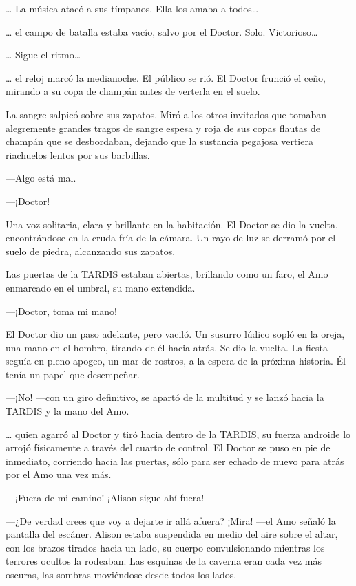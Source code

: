 {\ldots{} La música atacó a sus tímpanos. Ella los amaba a
 todos\ldots{}}

{\ldots{} el campo de batalla estaba vacío, salvo por el Doctor. Solo.
 Victorioso\ldots{}}

{\ldots{} Sigue el ritmo\ldots{}}

{\ldots{} el reloj marcó la medianoche. El público se rió. El Doctor
 frunció el ceño, mirando a su copa de champán antes de verterla en el
suelo.}

{La sangre salpicó sobre sus zapatos. Miró a los
 otros invitados que tomaban alegremente grandes tragos de sangre espesa
 y roja de sus copas flautas de champán que se desbordaban, dejando que
la sustancia pegajosa vertiera riachuelos lentos por sus barbillas.}

{---Algo está mal.}

{---¡Doctor!}

{Una voz solitaria, clara y brillante en la habitación. El Doctor se dio
 la vuelta, encontrándose en la cruda fría de la cámara. Un rayo de luz
se derramó por el suelo de piedra, alcanzando sus zapatos.}

{Las puertas de la TARDIS estaban abiertas, brillando como un faro, el
Amo enmarcado en el umbral, su mano extendida.}

{---¡Doctor, toma mi mano!}

{El Doctor dio un paso adelante, pero vaciló. Un susurro lúdico sopló en
 la oreja, una mano en el hombro, tirando de él hacia atrás. Se dio la
 vuelta. La fiesta seguía en pleno apogeo, un mar de rostros, a la espera
de la próxima historia. Él tenía un papel que desempeñar.}

{---¡No! ---con un giro definitivo, se apartó de la multitud y se lanzó
hacia la TARDIS y la mano del Amo.}

{\ldots{} quien
 agarró al Doctor y tiró hacia dentro de la TARDIS, su fuerza androide lo
 arrojó físicamente a través del cuarto de control. El Doctor se puso en
 pie de inmediato, corriendo hacia las puertas, sólo para ser echado de
nuevo para atrás por el Amo una vez más.}

{---¡Fuera de mi camino! ¡Alison sigue ahí fuera!}

{---¿De verdad crees que voy a dejarte ir allá afuera? ¡Mira! ---el Amo
 señaló la pantalla del escáner. Alison estaba suspendida en medio del
 aire sobre el altar, con los brazos tirados hacia un lado, su cuerpo
 convulsionando mientras los terrores ocultos la rodeaban. Las esquinas
 de la caverna eran cada vez más oscuras, las sombras moviéndose desde
todos los lados.}

